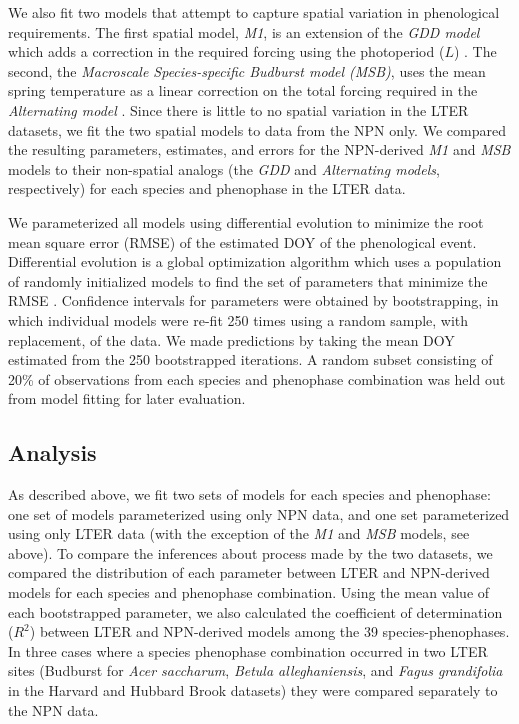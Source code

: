 \documentclass[fleqn,12pt,lineno]{wlpeerj} %
\begin{document}
We also fit two models that attempt to capture spatial variation in phenological requirements. The first spatial model, \textit{M1}, is an extension of the \textit{GDD model} which adds a correction in the required forcing using the photoperiod ($L$) \citep{blumel2012}. The second, the \textit{Macroscale Species-specific Budburst model (MSB)}, uses the mean spring temperature as a linear correction on the total forcing required in the \textit{Alternating model} \citep{jeong2013}. Since there is little to no spatial variation in the LTER datasets, we fit the two spatial models to data from the NPN only. We compared the resulting parameters, estimates, and errors for the NPN-derived \textit{M1} and \textit{MSB} models to their non-spatial analogs (the \textit{GDD} and \textit{Alternating models}, respectively) for each species and phenophase in the LTER data.  

We parameterized all models using differential evolution to minimize the root mean square error (RMSE) of the estimated DOY of the phenological event. Differential evolution is a global optimization algorithm which uses a population of randomly initialized models to find the set of parameters that minimize the RMSE \citep{storn1997}. Confidence intervals for parameters were obtained by bootstrapping, in which individual models were re-fit 250 times using a random sample, with replacement, of the data. We made predictions by taking the mean DOY estimated from the 250 bootstrapped iterations. A random subset consisting of 20\% of observations from each species and phenophase combination was held out from model fitting for later evaluation.

\subsection*{Analysis}

As described above, we fit two sets of models for each species and phenophase: one set of models parameterized using only NPN data, and one set parameterized using only LTER data (with the exception of the \textit{M1} and \textit{MSB} models, see above). To compare the inferences about process made by the two datasets, we compared the distribution of each parameter between LTER and NPN-derived models for each species and phenophase combination. Using the mean value of each bootstrapped parameter, we also calculated the coefficient of determination ($R^2$) between LTER and NPN-derived models among the 39 species-phenophases. In three cases where a species phenophase combination occurred in two LTER sites (Budburst for \textit{Acer saccharum}, \textit{Betula alleghaniensis}, and \textit{Fagus grandifolia} in the Harvard and Hubbard Brook datasets) they were compared separately to the NPN data.
\end{document}
